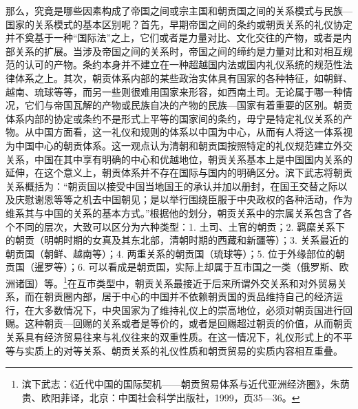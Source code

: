 \documentclass[a4paper, 12pt, openright]{ctexbook}
\begin{document}
那么，究竟是哪些因素构成了帝国之间或宗主国和朝贡国之间的关系模式与民族—国家的关系模式的基本区别呢？首先，早期帝国之间的条约或朝贡关系的礼仪协定并不奠基于一种“国际法”之上，它们或者是力量对比、文化交往的产物，或者是内部关系的扩展。当涉及帝国之间的关系时，帝国之间的缔约是力量对比和对相互规范的认可的产物。条约本身并不建立在一种超越国内法或国内礼仪系统的规范性法律体系之上。其次，朝贡体系内部的某些政治实体具有国家的各种特征，如朝鲜、越南、琉球等等，而另一些则很难用国家来形容，如西南土司。无论属于哪一种情况，它们与帝国瓦解的产物或民族自决的产物的民族—国家有着重要的区别。朝贡体系内部的协定或条约不是形式上平等的国家间的条约，毋宁是特定礼仪关系的产物。从中国方面看，这一礼仪和规则的体系以中国为中心，从而有人将这一体系视为中国中心的朝贡体系。这一观点认为清朝和朝贡国按照特定的礼仪规范建立外交关系，中国在其中享有明确的中心和优越地位，朝贡关系基本上是中国国内关系的延伸，在这个意义上，朝贡体系并不存在国际与国内的明确区分。滨下武志将朝贡关系概括为：“朝贡国以接受中国当地国王的承认并加以册封，在国王交替之际以及庆慰谢恩等等之机去中国朝见；是以举行围绕臣服于中央政权的各种活动，作为维系其与中国的关系的基本方式。”根据他的划分，朝贡关系中的宗属关系包含了各个不同的层次，大致可以区分为六种类型：1. 土司、土官的朝贡；2. 羁縻关系下的朝贡（明朝时期的女真及其东北部，清朝时期的西藏和新疆等）；3. 关系最近的朝贡国（朝鲜、越南等）；4. 两重关系的朝贡国（琉球等）；5. 位于外缘部位的朝贡国（暹罗等）；6. 可以看成是朝贡国，实际上却属于互市国之一类（俄罗斯、欧洲诸国）等。\footnote{滨下武志：《近代中国的国际契机——朝贡贸易体系与近代亚洲经济圈》，朱荫贵、欧阳菲译，北京：中国社会科学出版社，1999，页35—36。}在互市类型中，朝贡关系最接近于后来所谓外交关系和对外贸易关系，而在朝贡圈内部，居于中心的中国并不依赖朝贡国的贡品维持自己的经济运行，在大多数情况下，中央国家为了维持礼仪上的崇高地位，必须对朝贡国进行回赐。这种朝贡—回赐的关系或者是等价的，或者是回赐超过朝贡的价值，从而朝贡关系具有经济贸易往来与礼仪往来的双重性质。在这一情况下，礼仪形式上的不平等与实质上的对等关系、朝贡关系的礼仪性质和朝贡贸易的实质内容相互重叠。
\end{document}
